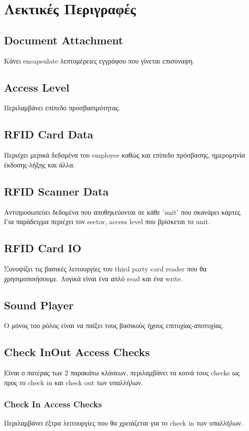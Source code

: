 \documentclass{article}
\begin{document}
\section{Λεκτικές Περιγραφές}

\subsection{Document Attachment}
Κάνει encapsulate λεπτομέρειες εγγράφου που γίνεται επισύναψη.

\subsection{Access Level}
Περιλαμβάνει επίπεδο προσβασιμότητας.

\subsection{RFID Card Data}
Περιέχει μερικά δεδομένα του employee καθώς και επίπεδο πρόσβασης, ημερομηνία έκδοσης-λήξης και άλλα.

\subsection{RFID Scanner Data}
Αντιπροσωπεύει δεδομένα που αποθηκεύονται σε κάθε 'unit' που σκανάρει κάρτες. Για παράδειγμα περιέχει τον sector, access level που βρίσκεται το unit.

\subsection{RFID Card IO}
Συνοψίζει τις βασικές λειτουργίες του third party card reader που θα χρησιμοποιήσουμε. Λογικά είναι ένα απλό read και ένα write.
\subsection{Sound Player}
Ο μόνος του ρόλος είναι να παίξει τους βασικούς ήχους επιτυχίας-αποτυχίας.
\subsection{Check InOut Access Checks}
Είναι ο πατέρας των 2 παρακάτω κλάσεων, περιλαμβάνει τα κοινά τους checks ως προς το check in και check out των υπαλλήλων.
\subsubsection{Check In Access Checks}
Περιλαμβάνει έξτρα λειτουργίες που θα χρειάζεται για το check in των υπαλλήλων.
\end{document}
